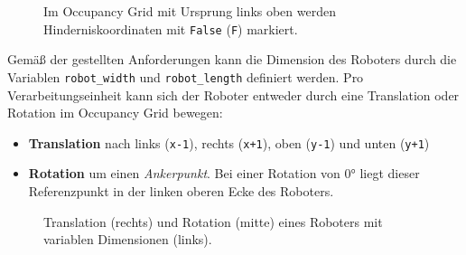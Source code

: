 \begin{figure}[h!]
\begin{minipage}{0.46\textwidth}
	\end{minipage}
	\caption{Im Occupancy Grid mit Ursprung links oben werden Hinderniskoordinaten mit \texttt{False} (\texttt{F}) markiert.}
\end{figure}

Gemäß der gestellten Anforderungen kann die Dimension des Roboters durch die Variablen \texttt{robot\_width} und \texttt{robot\_length} definiert werden. Pro Verarbeitungseinheit kann sich der Roboter entweder durch eine Translation oder Rotation im Occupancy Grid bewegen:
\begin{itemize}
\item \textbf{Translation} nach links (\texttt{x-1}), rechts (\texttt{x+1}), oben (\texttt{y-1}) und unten (\texttt{y+1})
\item \textbf{Rotation} um einen \textit{Ankerpunkt}. Bei einer Rotation von $0$° liegt dieser Referenzpunkt in der linken oberen Ecke des Roboters.
\end{itemize}

\begin{figure}[h!]
	\centering
	\small
	\centerline{\resizebox{\linewidth}{!}{}}
	\caption{Translation (rechts) und Rotation (mitte) eines Roboters mit variablen Dimensionen (links).}
\end{figure}

